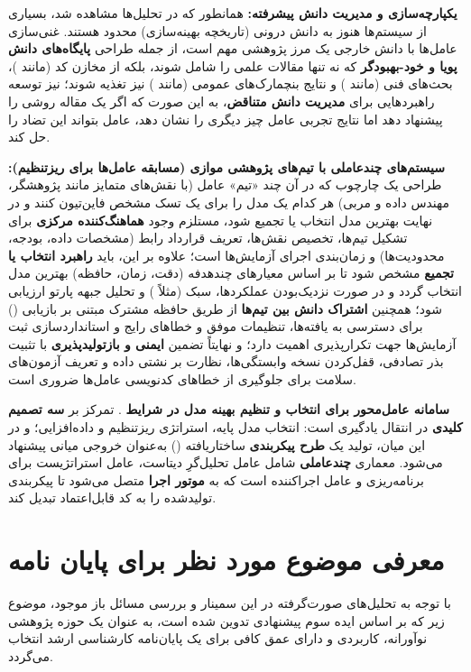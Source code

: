 \textbf{یکپارچه‌سازی و مدیریت دانش پیشرفته:} همانطور که در تحلیل‌ها مشاهده شد، بسیاری از سیستم‌ها هنوز به دانش درونی (تاریخچه بهینه‌سازی) محدود هستند. غنی‌سازی عامل‌ها با دانش خارجی یک مرز پژوهشی مهم است، از جمله طراحی \textbf{پایگاه‌های دانش پویا و خود-بهبودگر} که نه تنها مقالات علمی را شامل شوند، بلکه از مخازن کد (مانند )، بحث‌های فنی (مانند ) و نتایج بنچمارک‌های عمومی (مانند ) نیز تغذیه شوند؛ نیز توسعه راهبردهایی برای \textbf{مدیریت دانش متناقض}، به این صورت که اگر یک مقاله روشی را پیشنهاد دهد اما نتایج تجربی عامل چیز دیگری را نشان دهد، عامل بتواند این تضاد را حل کند.

\textbf{سیستم‌های چندعاملی با تیم‌های پژوهشی موازی (مسابقه عامل‌ها برای ریزتنظیم):} طراحی یک چارچوب که در آن چند «تیم» عامل (با نقش‌های متمایز مانند پژوهشگر، مهندس داده و مربی) هر کدام یک مدل را برای یک تسک مشخص فاین‌تیون کنند و در نهایت بهترین مدل انتخاب یا تجمیع شود، مستلزم وجود \textbf{هماهنگ‌کننده مرکزی} برای تشکیل تیم‌ها، تخصیص نقش‌ها، تعریف قرارداد رابط (مشخصات داده، بودجه، محدودیت‌ها) و زمان‌بندی اجرای آزمایش‌ها است؛ علاوه بر این، باید \textbf{راهبرد انتخاب یا تجمیع} مشخص شود تا بر اساس معیارهای چندهدفه (دقت، زمان، حافظه) بهترین مدل انتخاب گردد و در صورت نزدیک‌بودن عملکردها،  سبک (مثلاً ) و تحلیل جبهه پارتو ارزیابی شود؛ همچنین \textbf{اشتراک دانش بین تیم‌ها} از طریق حافظه مشترک مبتنی بر بازیابی () برای دسترسی به یافته‌ها، تنظیمات موفق و خطاهای رایج و استانداردسازی ثبت آزمایش‌ها جهت تکرارپذیری اهمیت دارد؛ و نهایتاً تضمین \textbf{ایمنی و بازتولیدپذیری} با تثبیت بذر تصادفی، قفل‌کردن نسخه‌ وابستگی‌ها، نظارت بر نشتی داده و تعریف آزمون‌های سلامت برای جلوگیری از خطاهای کدنویسی عامل‌ها ضروری است.

\textbf{سامانه عامل‌محور برای انتخاب و تنظیم بهینه مدل در شرایط }. تمرکز بر \textbf{سه تصمیم کلیدی} در انتقال یادگیری است: انتخاب مدل پایه، استراتژی ریزتنظیم و داده‌افزایی؛ و در این میان، تولید یک \textbf{طرح پیکربندی} ساختاریافته () به‌عنوان خروجی میانی پیشنهاد می‌شود. معماری \textbf{چندعاملی} شامل عامل تحلیل‌گرِ دیتاست، عامل استراتژیست برای برنامه‌ریزی و عامل اجراکننده است که به \textbf{موتور اجرا} متصل می‌شود تا پیکربندی تولیدشده را به کد قابل‌اعتماد تبدیل کند.

\section{معرفی موضوع مورد نظر برای پایان نامه}

با توجه به تحلیل‌های صورت‌گرفته در این سمینار و بررسی مسائل باز موجود، موضوع زیر که بر اساس ایده سوم پیشنهادی تدوین شده است، به عنوان یک حوزه پژوهشی نوآورانه، کاربردی و دارای عمق کافی برای یک پایان‌نامه کارشناسی ارشد انتخاب می‌گردد.

